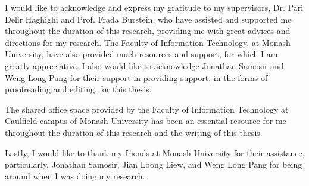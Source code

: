 
\begin{acknowledgements}      

I would like to acknowledge and express my gratitude to my supervisors, Dr. Pari Delir Haghighi and Prof. Frada Burstein, who have assisted and supported me throughout the duration of this research, providing me with great advices and directions for my research. The Faculty of Information Technology, at Monash University, have also provided much resources and support, for which I am greatly appreciative. I also would like to acknowledge Jonathan Samosir and Weng Long Pang for their support in providing support, in the forms of proofreading and editing, for this thesis.

The shared office space provided by the Faculty of Information Technology at Caulfield campus of Monash University has been an essential resource for me throughout the duration of this research and the writing of this thesis.

Lastly, I would like to thank my friends at Monash University for their assistance, particularly, Jonathan Samosir, Jian Loong Liew, and Weng Long Pang for being around when I was doing my research.

\end{acknowledgements}
